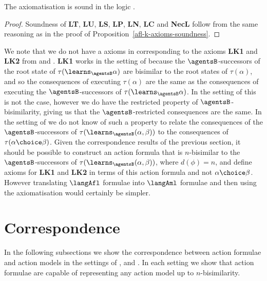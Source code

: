 \documentclass[twoside]{aiml14}
\begin{document}
  \begin{proposition}\label{afl-s-axioms-soundness}
      The axiomatisation \axiomAflS{} is sound in the logic \logicAmlS{}.
  \end{proposition}

  \begin{proof}
      Soundness of {\bf LT}, {\bf LU}, {\bf LS}, {\bf LP}, {\bf LN}, {\bf LC}
      and {\bf NecL} follow from the same reasoning as in the proof of
      Proposition~\ref{afl-k-axioms-soundness}.
  \end{proof}

  We note that we do not have a axioms in \logicAflS{} corresponding to the
  axioms {\bf LK1} and {\bf LK2} from \axiomAflK{} and \axiomAflKFF{}.
  {\bf LK1} works in the setting of \classK{} because the $\agentsB$-successors
  of the root state of $\tau(\learns_\agentsB \alpha)$ are bisimilar to the
  root states of $\tau(\alpha)$, and so the consequences of executing
  $\tau(\alpha)$ are the same as the consequences of executing the
  $\agentsB$-successors of $\tau(\learns_\agentsB \alpha)$. In the setting of
  \classKFF{} this is not the case, however we do have the restricted property
  of $\agentsB$-bisimilarity, giving us that the $\agentsB$-restricted
  consequences are the same. In the setting of \classS{} we do not know of such
  a property to relate the consequences of the $\agentsB$-successors of
  $\tau(\learns_\agentsB (\alpha, \beta))$ to the consequences of $\tau(\alpha
  \choice \beta)$. Given the correspondence results of the previous section, it
  should be possible to construct an action formula that is $n$-bisimilar to
  the $\agentsB$-successors of $\tau(\learns_\agentsB (\alpha, \beta))$, where
  $d(\phi) = n$, and define axioms for {\bf LK1} and {\bf LK2} in terms of
  this action formula and not $\alpha \choice \beta$. However translating
  $\langAfl$ formulae into $\langAml$ formulae and then using the
  axiomatisation \axiomAmlS{} would certainly be simpler.

  \section{Correspondence}\label{correspondence}

  In the following subsections we show the correspondence between action
  formulae and action models in the settings of \classK{}, \classKFF{} and
  \classS{}. In each setting we show that action formulae are capable of
  representing any action model up to $n$-bisimilarity.
\end{document}
